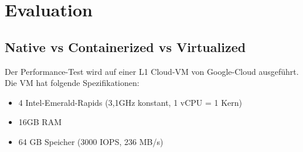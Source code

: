 \chapter{Evaluation}

\section{Native vs Containerized vs Virtualized}

Der Performance-Test wird auf einer L1 Cloud-VM von Google-Cloud ausgeführt. 
Die VM hat folgende Spezifikationen:

\begin{itemize}
    \item 4 Intel-Emerald-Rapids (3,1GHz konstant, 1 vCPU = 1 Kern)
    \item 16GB RAM
    \item 64 GB Speicher (3000 IOPS, 236 MB/s)
\end{itemize}

